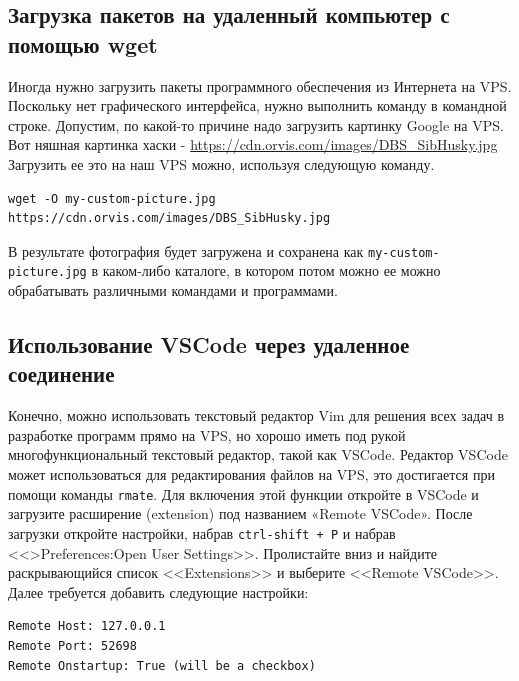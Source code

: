\documentclass[a4paper,12pt,final,openany]{extbook}
\begin{document}
\hypertarget{Downloading-packages-to-your-remote-machine-with-wget}{%
\subsection{\texorpdfstring{\protect\hyperlink{Downloading-packages-to-your-remote-machine-with-wget}{}Загрузка
пакетов на удаленный компьютер с помощью
wget}{Загрузка пакетов на удаленный компьютер с помощью wget}}\label{Downloading-packages-to-your-remote-machine-with-wget}}

Иногда нужно загрузить пакеты программного обеспечения из Интернета на
VPS. Поскольку нет графического интерфейса, нужно выполнить команду в
командной строке. Допустим, по какой-то причине надо загрузить картинку
Google на VPS.
Вот няшная картинка хаски -
\url{https://cdn.orvis.com/images/DBS_SibHusky.jpg}
Загрузить ее это на наш VPS можно, используя следующую команду.
\begin{verbatim}
wget -O my-custom-picture.jpg https://cdn.orvis.com/images/DBS_SibHusky.jpg
\end{verbatim}
В результате фотография будет загружена и сохранена как
\texttt{my-custom-picture.jpg} в каком-либо каталоге, в котором потом
можно ее можно обрабатывать различными командами и программами.

\hypertarget{Using-VSCode-with-your-remote-machine}{%
\subsection{\texorpdfstring{\protect\hyperlink{Using-VSCode-with-your-remote-machine}{}Использование VSCode через удаленное
соединение}{Использование VSCode через удаленное соединение}}\label{Using-VSCode-with-your-remote-machine}}

Конечно, можно использовать текстовый редактор Vim для решения всех
задач в разработке программ прямо на VPS, но хорошо иметь под рукой
многофункциональный текстовый редактор, такой как VSCode. Редактор
VSCode может использоваться для редактирования файлов на VPS, это
достигается при помощи команды \texttt{rmate}. Для включения этой
функции откройте в VSCode и загрузите расширение (extension) под
названием «Remote VSCode». После загрузки откройте настройки, набрав
\texttt{ctrl-shift + P} и набрав <<\textgreater Preferences:Open User Settings>>.
Пролистайте вниз и найдите раскрывающийся список <<Extensions>> и выберите
<<Remote VSCode>>. Далее требуется добавить следующие настройки:
\begin{verbatim}
Remote Host: 127.0.0.1
Remote Port: 52698
Remote Onstartup: True (will be a checkbox)
\end{verbatim}
\end{document}
